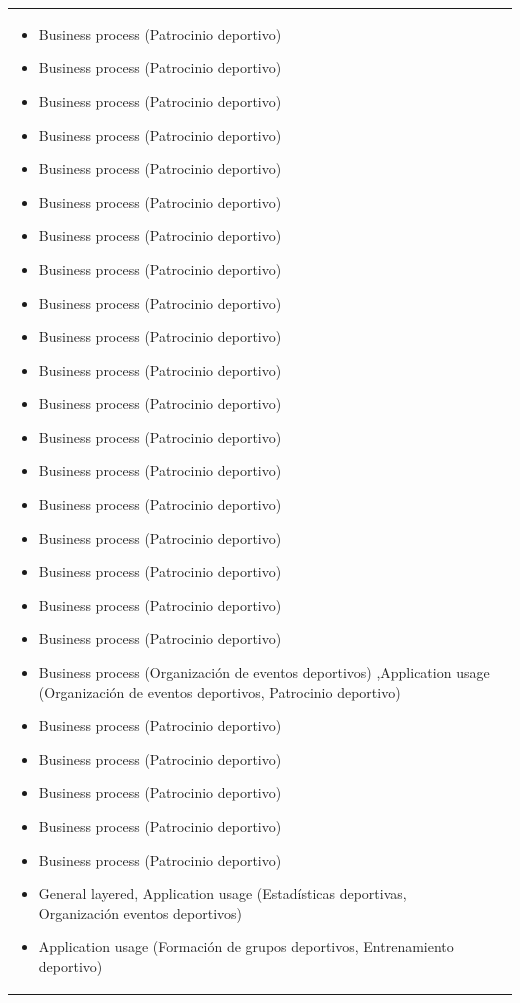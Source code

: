 \begin{table}[!htb]
\begin{center}
{\begin{tabular}{|p{7cm}|p{4cm}|}
\begin{itemize}
				\item Business process (Patrocinio deportivo)
				\item Business process (Patrocinio deportivo)
				\item Business process (Patrocinio deportivo)
				\item Business process (Patrocinio deportivo)
				\item Business process (Patrocinio deportivo)
				\item Business process (Patrocinio deportivo)
				\item Business process (Patrocinio deportivo)
				\item Business process (Patrocinio deportivo)
				\item Business process (Patrocinio deportivo)
				\item Business process (Patrocinio deportivo)
				\item Business process (Patrocinio deportivo)
				\item Business process (Patrocinio deportivo)
				\item Business process (Patrocinio deportivo)
				\item Business process (Patrocinio deportivo)
				\item Business process (Patrocinio deportivo)
				\item Business process (Patrocinio deportivo)
				\item Business process (Patrocinio deportivo)
				\item Business process (Patrocinio deportivo)
				\item Business process (Patrocinio deportivo)
				\item Business process (Organización de eventos deportivos) ,Application usage (Organización de eventos deportivos, Patrocinio deportivo)
				\item Business process (Patrocinio deportivo)
				\item Business process (Patrocinio deportivo)
				\item Business process (Patrocinio deportivo)
				\item Business process (Patrocinio deportivo)
				\item Business process (Patrocinio deportivo)
				\item General layered, Application usage (Estadísticas deportivas, Organización eventos deportivos)
				\item Application usage (Formación de grupos deportivos, Entrenamiento deportivo)

\end{itemize}
\end{tabular}}
\end{center}
\end{table}
